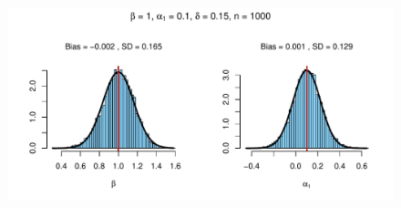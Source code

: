 \documentclass{beamer}
\begin{document}
\begin{frame}[plain,c]

  \begin{figure}[h]
    \centering
    \includegraphics[width=\textwidth]{Rplot4}
  \end{figure}

\end{frame}
%
%
%
%
%
%
%
%
\end{document}
